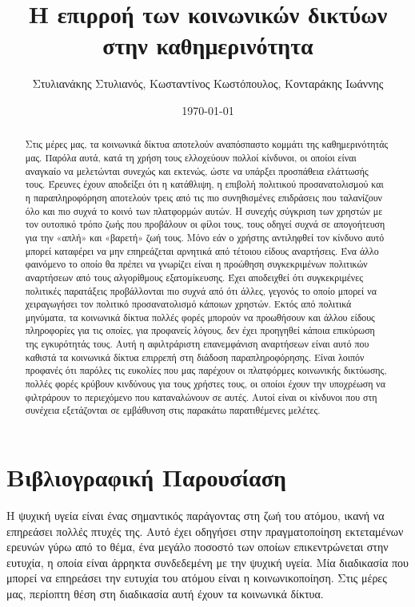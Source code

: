 \documentclass{article}
\title{Η επιρροή των κοινωνικών δικτύων στην καθημερινότητα}
\author{Στυλιανάκης Στυλιανός, Κωσταντίνος Κωστόπουλος, Κονταράκης Ιωάννης}
\date{\today}
\begin{document}
\maketitle  
\begin{abstract}
Στις μέρες μας, τα κοινωνικά δίκτυα αποτελούν αναπόσπαστο κομμάτι της καθημερινότητάς μας. Παρόλα αυτά, κατά τη χρήση τους ελλοχεύουν πολλοί κίνδυνοι, οι οποίοι είναι αναγκαίο να μελετώνται συνεχώς και εκτενώς, ώστε να υπάρξει προσπάθεια ελάττωσής τους. Έρευνες έχουν αποδείξει ότι η κατάθλιψη, η επιβολή πολιτικού προσανατολισμού και η παραπληροφόρηση αποτελούν τρεις από τις πιο συνηθισμένες επιδράσεις που ταλανίζουν όλο και πιο συχνά το κοινό των πλατφορμών αυτών. Η συνεχής σύγκριση των χρηστών με τον ουτοπικό τρόπο ζωής που προβάλουν οι φίλοι τους, τους οδηγεί συχνά σε απογοήτευση για την «απλή» και «βαρετή» ζωή τους. Μόνο εάν ο χρήστης αντιληφθεί τον κίνδυνο αυτό μπορεί καταφέρει να μην επηρεάζεται αρνητικά από τέτοιου είδους αναρτήσεις. Ένα άλλο φαινόμενο το οποίο θα πρέπει να γνωρίζει είναι η προώθηση συγκεκριμένων πολιτικών αναρτήσεων από τους αλγορίθμους εξατομίκευσης. Έχει αποδειχθεί ότι συγκεκριμένες πολιτικές παρατάξεις προβάλλονται πιο συχνά από ότι άλλες, γεγονός το οποίο μπορεί να χειραγωγήσει τον πολιτικό προσανατολισμό κάποιων χρηστών. Εκτός από πολιτικά μηνύματα, τα κοινωνικά δίκτυα πολλές φορές μπορούν να προωθήσουν και άλλου είδους πληροφορίες για τις οποίες, για προφανείς λόγους, δεν έχει προηγηθεί κάποια επικύρωση της εγκυρότητάς τους. Αυτή η αφιλτράριστη επανεμφάνιση αναρτήσεων είναι αυτό που καθιστά τα κοινωνικά δίκτυα επιρρεπή στη διάδοση παραπληροφόρησης. Είναι λοιπόν προφανές ότι παρόλες τις ευκολίες που μας παρέχουν οι πλατφόρμες κοινωνικής δικτύωσης, πολλές φορές κρύβουν κινδύνους για τους χρήστες τους, οι οποίοι έχουν την υποχρέωση να φιλτράρουν το περιεχόμενο που καταναλώνουν σε αυτές. Αυτοί είναι οι κίνδυνοι που στη συνέχεια εξετάζονται σε εμβάθυνση στις παρακάτω παρατιθέμενες μελέτες.
\end{abstract}
\clearpage 
\tableofcontents
\section{Βιβλιογραφική Παρουσίαση}
Η ψυχική υγεία είναι ένας σημαντικός παράγοντας στη ζωή του ατόμου, ικανή να επηρεάσει πολλές πτυχές της. Αυτό έχει οδηγήσει στην πραγματοποίηση εκτεταμένων ερευνών γύρω από το θέμα, ένα μεγάλο ποσοστό των οποίων επικεντρώνεται στην ευτυχία, η οποία είναι άρρηκτα συνδεδεμένη με την ψυχική υγεία. Μία διαδικασία που μπορεί να επηρεάσει την ευτυχία του ατόμου είναι η κοινωνικοποίηση. Στις μέρες μας, περίοπτη θέση στη διαδικασία αυτή έχουν τα κοινωνικά δίκτυα.
\end{document}

